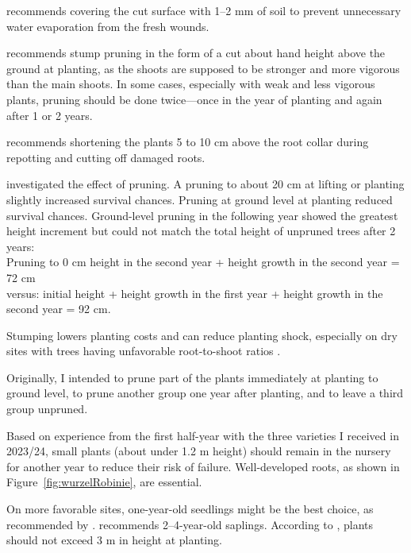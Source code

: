 \citet{bier1958robinie} recommends covering the cut surface with 1–2 mm of soil to prevent unnecessary water evaporation from the fresh wounds.

\citet[p.~78]{erteld1952robinieErtrag} recommends stump pruning in the form of a cut about hand height above the ground at planting, as the shoots are supposed to be stronger and more vigorous than the main shoots. In some cases, especially with weak and less vigorous plants, pruning should be done twice—once in the year of planting and again after 1 or 2 years.

\citet{bund1899robinie} recommends shortening the plants 5 to 10 cm above the root collar during repotting and cutting off damaged roots.

\citet{meginnis1940robinieRueckschnitt} investigated the effect of pruning. A pruning to about 20 cm at lifting or planting slightly increased survival chances. Pruning at ground level at planting reduced survival chances. Ground-level pruning in the following year showed the greatest height increment but could not match the total height of unpruned trees after 2 years:\\
Pruning to 0 cm height in the second year + height growth in the second year = 72 cm\\
versus: initial height + height growth in the first year + height growth in the second year = 92 cm.

Stumping lowers planting costs and can reduce planting shock, especially on dry sites with trees having unfavorable root-to-shoot ratios \citep{south1996toppruning,south1998toppruning,south2016toppruning}.

Originally, I intended to prune part of the plants immediately at planting to ground level, to prune another group one year after planting, and to leave a third group unpruned.

Based on experience from the first half-year with the three varieties I received in 2023/24, small plants (about under 1.2 m height) should remain in the nursery for another year to reduce their risk of failure. Well-developed roots, as shown in Figure~\ref{fig:wurzelRobinie}, are essential.


On more favorable sites, one-year-old seedlings might be the best choice, as recommended by \citet{ciuvat2022robinieRumaenien}. \citet[p.~51]{fekete1931robinieErtragstafel} recommends 2–4-year-old saplings. According to \citet{fuehrer2005robinie}, plants should not exceed 3 m in height at planting.

